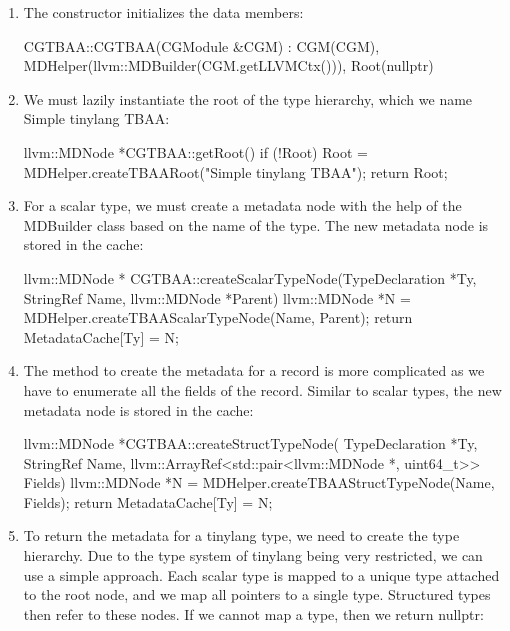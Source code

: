 \begin{enumerate}
\item
The constructor initializes the data members:

\begin{cpp}
CGTBAA::CGTBAA(CGModule &CGM)
    : CGM(CGM),
    MDHelper(llvm::MDBuilder(CGM.getLLVMCtx())),
    Root(nullptr) {}
\end{cpp}

\item
We must lazily instantiate the root of the type hierarchy, which we name Simple tinylang TBAA:

\begin{cpp}
llvm::MDNode *CGTBAA::getRoot() {
    if (!Root)
        Root = MDHelper.createTBAARoot("Simple tinylang TBAA");
    return Root;
}
\end{cpp}

\item
For a scalar type, we must create a metadata node with the help of the MDBuilder class based
on the name of the type. The new metadata node is stored in the cache:

\begin{cpp}
llvm::MDNode *
CGTBAA::createScalarTypeNode(TypeDeclaration *Ty,
                            StringRef Name,
                            llvm::MDNode *Parent) {
    llvm::MDNode *N =
        MDHelper.createTBAAScalarTypeNode(Name, Parent);
    return MetadataCache[Ty] = N;
}
\end{cpp}

\item
The method to create the metadata for a record is more complicated as we have to enumerate all the fields of the record. Similar to scalar types, the new metadata node is stored in the cache:

\begin{cpp}
llvm::MDNode *CGTBAA::createStructTypeNode(
        TypeDeclaration *Ty, StringRef Name,
        llvm::ArrayRef<std::pair<llvm::MDNode *, uint64_t>> Fields) {
    llvm::MDNode *N =
        MDHelper.createTBAAStructTypeNode(Name, Fields);
    return MetadataCache[Ty] = N;
}
\end{cpp}

\item
To return the metadata for a tinylang type, we need to create the type hierarchy. Due to the type system of tinylang being very restricted, we can use a simple approach. Each scalar type is mapped to a unique type attached to the root node, and we map all pointers to a single type. Structured types then refer to these nodes. If we cannot map a type, then we return nullptr:


\end{enumerate}
